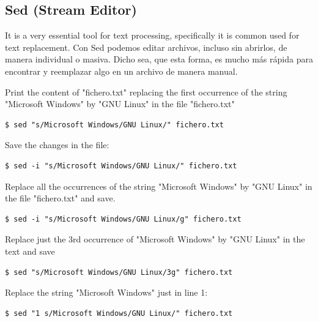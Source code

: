 \documentclass{article}
\newenvironment{codetemplate}[1][]{%
  \mybasecolorbox[#1]
  \itshape
}{%
  \endmybasecolorbox
}
\begin{document}
\subsection{Sed (Stream Editor)}

 It is a very essential tool for text processing, specifically it is common used for text replacement. Con Sed podemos editar archivos, incluso sin abrirlos, de manera individual o masiva. Dicho sea, que esta forma, es mucho más rápida para encontrar y reemplazar algo en un archivo de manera manual.

 Print the content of "fichero.txt" replacing the first occurrence of the string "Microsoft Windows" by "GNU Linux" in the file "fichero.txt"
\begin{codetemplate}{}
\begin{verbatim}
$ sed "s/Microsoft Windows/GNU Linux/" fichero.txt
\end{verbatim}
\end{codetemplate}

Save the changes in the file:
\begin{codetemplate}{}
\begin{verbatim}
$ sed -i "s/Microsoft Windows/GNU Linux/" fichero.txt
\end{verbatim}
\end{codetemplate}

 Replace all the occurrences of the string "Microsoft Windows" by "GNU Linux" in the file "fichero.txt" and save.
 \begin{codetemplate}{}
\begin{verbatim}
$ sed -i "s/Microsoft Windows/GNU Linux/g" fichero.txt
\end{verbatim}
\end{codetemplate}

 Replace just the 3rd occurrence of "Microsoft Windows" by "GNU Linux" in the text and save
\begin{codetemplate}{}
\begin{verbatim}
$ sed "s/Microsoft Windows/GNU Linux/3g" fichero.txt
\end{verbatim}
\end{codetemplate}

Replace the string "Microsoft Windows" just in line 1:
\begin{codetemplate}{}
\begin{verbatim}
$ sed "1 s/Microsoft Windows/GNU Linux/" fichero.txt
\end{verbatim}
\end{codetemplate}
\end{document}
